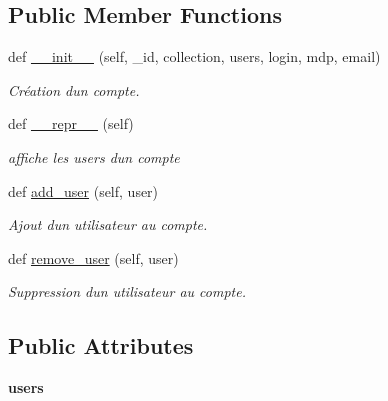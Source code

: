 \subsection*{Public Member Functions}
\begin{DoxyCompactItemize}
\item 
def \mbox{\hyperlink{classSource_1_1core_1_1account_1_1Account_aa71293ac376857c39d9fcbac6e0326e3}{\+\_\+\+\_\+init\+\_\+\+\_\+}} (self, \+\_\+id, collection, users, login, mdp, email)
\begin{DoxyCompactList}\small\item\em Création d\textquotesingle{}un compte. \end{DoxyCompactList}\item 
\mbox{\label{classSource_1_1core_1_1account_1_1Account_a9c3523f9d004418ecc133edd9609d0ee}} 
def \mbox{\hyperlink{classSource_1_1core_1_1account_1_1Account_a9c3523f9d004418ecc133edd9609d0ee}{\+\_\+\+\_\+repr\+\_\+\+\_\+}} (self)
\begin{DoxyCompactList}\small\item\em affiche les users d\textquotesingle{}un compte \end{DoxyCompactList}\item 
def \mbox{\hyperlink{classSource_1_1core_1_1account_1_1Account_af7fe8d9e5acb618decb4d24e25df1369}{add\+\_\+user}} (self, user)
\begin{DoxyCompactList}\small\item\em Ajout d\textquotesingle{}un utilisateur au compte. \end{DoxyCompactList}\item 
def \mbox{\hyperlink{classSource_1_1core_1_1account_1_1Account_a6ea6932799b88c2cad17b8c1ce562061}{remove\+\_\+user}} (self, user)
\begin{DoxyCompactList}\small\item\em Suppression d\textquotesingle{}un utilisateur au compte. \end{DoxyCompactList}\end{DoxyCompactItemize}
\subsection*{Public Attributes}
\begin{DoxyCompactItemize}
\item 
\mbox{\label{classSource_1_1core_1_1account_1_1Account_ab226de30006271964576c7716c554283}} 
{\bfseries users}
\end{DoxyCompactItemize}
